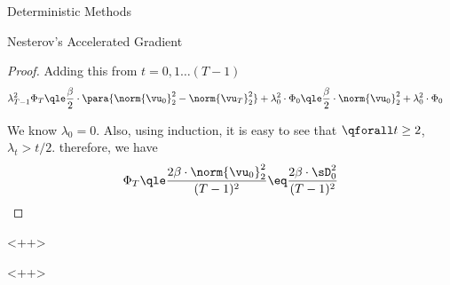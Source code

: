 \documentclass{article}
\begin{document}
\begin{psection}{Deterministic Methods}
\begin{psubsection}{Nesterov's Accelerated Gradient}
\begin{theorem}
\begin{proof}
				Adding this from $t = 0, 1 \dots (T - 1)$
				\begin{align*}
					\lambda_{T - 1}^2 \Phi_{T}	&\qle	\frac{\beta}{2} \cdot \para{\norm{\vu_0}_2^2 - \norm{\vu_T}_2^2} + \lambda_{0}^2 \cdot \Phi_{0}	\qle	\frac{\beta}{2} \cdot \norm{\vu_0}_2^2 + \lambda_0^2 \cdot \Phi_0
				\end{align*}

				We know $\lambda_0 = 0$. Also, using induction, it is easy to see that $\qforall t \ge 2$, $\lambda_{t} > t / 2$. therefore, we have
				\begin{align*}
					\Phi_T	\qle	\frac{2 \beta \cdot \norm{\vu_0}_2^2}{(T - 1)^2}	\eq	\frac{2 \beta \cdot \sD_0^2}{(T - 1)^2}
				\end{align*}
			\end{proof}
		\end{theorem}

	\end{psubsection}<++>

\end{psection}<++>
\end{document}
